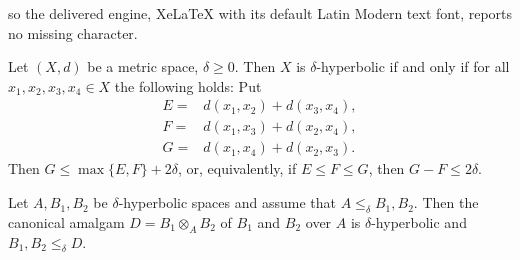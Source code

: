 \documentclass[10pt,a4paper]{amsart}
\renewcommand{\d}{\delta}
\begin{document}
so the delivered engine, XeLaTeX with its default Latin Modern text font, reports no missing character.
\begin{definition}\label{def:hyperbolic}
Let $(X,d)$ be a metric space, $\d\geq 0$. Then $X$ is $\d$-hyperbolic if and only if for all $x_1, x_2, x_3, x_4\in X$  the following holds: Put
\begin{align*}
E=&d(x_1, x_2)+d(x_3,x_4),\\
 F=&d(x_1, x_3)+d(x_2,x_4),\\ 
 G=&d(x_1, x_4)+d(x_2,x_3).
\end{align*}
\noindent
Then $G\leq \max\{E, F\}+2\d$, or, equivalently, if $E\leq F\leq G$, then $G-F\leq 2\d$.
\end{definition}

\begin{lemma}\label{lem:amalgamation}

Let $A, B_1, B_2$ be $\d$-hyperbolic spaces and assume that $A\leq_\d B_1,B_2$. Then 
the canonical amalgam $D=B_1\otimes_AB_2$ of $B_1$ and $B_2$ over $A$ is $\d$-hyperbolic and $B_1,B_2\leq_\d D$.
\end{lemma}
\end{document}
